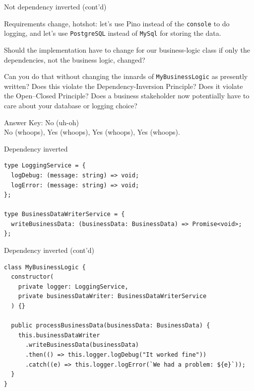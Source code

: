 \documentclass[aspectratio=169]{beamer}
\begin{document}
\begin{frame}{Not dependency inverted (cont'd)}

  Requirements change, hotshot: let's use Pino instead of the
  \lstinline{console} to do logging, and let's use \lstinline{PostgreSQL}
  instead of \lstinline{MySql} for storing the data.

  \vspace{1em}

  Should the implementation have to change for our business-logic class if only
  the dependencies, not the business logic, changed?

  \vspace{1em}

  Can you do that without changing the innards of \lstinline{MyBusinessLogic} as
  presently written? Does this violate the Dependency-Inversion Principle? Does
  it violate the Open--Closed Principle? Does a business stakeholder now
  potentially have to care about your database or logging choice?

  \vspace{1em}

  Answer Key: No (uh-oh) \\
  No (whoops), Yes (whoops), Yes (whoops), Yes (whoops).

\end{frame}


\begin{frame}[fragile]{Dependency inverted}
  \begin{lstlisting}[basicstyle=\footnotesize]
type LoggingService = {
  logDebug: (message: string) => void;
  logError: (message: string) => void;
};

type BusinessDataWriterService = {
  writeBusinessData: (businessData: BusinessData) => Promise<void>;
};
  \end{lstlisting}
\end{frame}

\begin{frame}[fragile]{Dependency inverted (cont'd)}
  \begin{lstlisting}[basicstyle=\footnotesize]
class MyBusinessLogic {
  constructor(
    private logger: LoggingService,
    private businessDataWriter: BusinessDataWriterService
  ) {}

  public processBusinessData(businessData: BusinessData) {
    this.businessDataWriter
      .writeBusinessData(businessData)
      .then(() => this.logger.logDebug("It worked fine"))
      .catch((e) => this.logger.logError(`We had a problem: ${e}`));
  }
}
  \end{lstlisting}
\end{frame}
\end{document}
